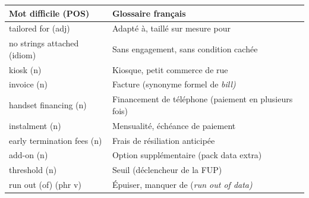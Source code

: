 \documentclass[11pt]{article}
\newcommand{\cle}[1]{{\popxbold\color{popdark}#1}}
\newcommand{\eng}[1]{\ifmmode\text{\textit{#1}}\else\begingroup\selectlanguage{english}\itshape #1\endgroup\fi}
\begin{document}
\begin{center}
\begin{tabularx}{\linewidth}{|l|X|}
\hline
\rowcolor{popgreenL} \textbf{Mot difficile (POS)} & \textbf{Glossaire français} \\
\hline
\cle{tailored for} (adj) & Adapté à, taillé sur mesure pour \\
\cle{no strings attached} (idiom) & Sans engagement, sans condition cachée \\
\cle{kiosk} (n) & Kiosque, petit commerce de rue \\
\cle{invoice} (n) & Facture (synonyme formel de \eng{bill}) \\
\cle{handset financing} (n) & Financement de téléphone (paiement en plusieurs fois) \\
\cle{instalment} (n) & Mensualité, échéance de paiement \\
\cle{early termination fees} (n) & Frais de résiliation anticipée \\
\cle{add-on} (n) & Option supplémentaire (pack data extra) \\
\cle{threshold} (n) & Seuil (déclencheur de la FUP) \\
\cle{run out (of)} (phr v) & Épuiser, manquer de (\eng{run out of data}) \\
\hline
\end{tabularx}
\end{center}
\end{document}
